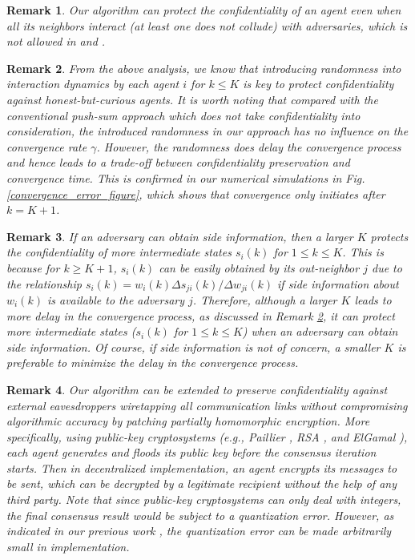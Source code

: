 \documentclass{IEEEtran}
\newtheorem{Remark}{Remark}
\begin{document}
\begin{Remark}\label{remark_different_from_other_papers}
	Our algorithm can protect the confidentiality of an agent even when all its neighbors interact (at least one does not collude) with adversaries, which is not allowed in \cite{mo2017privacy} and \cite{manitara2013privacy}.
\end{Remark}

\begin{Remark}\label{remark_tradeoff_privacy_convergence}
	From the above analysis, we know that introducing randomness into interaction dynamics by each agent $i$ for $k\leq K$ is key to protect confidentiality against honest-but-curious agents. It is worth noting that compared with the conventional push-sum approach which does not take confidentiality into consideration, the introduced randomness in our approach has no influence on the convergence rate $\gamma$. However, the randomness does delay the convergence process and hence leads to a trade-off between confidentiality preservation and convergence time. This is confirmed in our numerical simulations in Fig. \ref{convergence_error_figure}, which shows that convergence only initiates after $k = K+1$.
\end{Remark}

\begin{Remark}\label{remark_tradeoff_intermediate_privacy}	
	If an adversary can obtain side information, then a larger $K$ protects the confidentiality of more intermediate states $s_i(k)$ for $1\leq k\leq K$. This is because for $k \geq K+1$, $s_i(k)$ can be easily obtained by its out-neighbor $j$ due to the relationship $s_i(k)=w_i(k) \Delta s_{ji}(k)/\Delta w_{ji}(k)$ if side information about $w_i(k)$ is available to the adversary $j$. Therefore, although a larger $K$ leads to more delay in the convergence process, as discussed in Remark \ref{remark_tradeoff_privacy_convergence}, it can protect more intermediate states ($s_i(k)$ for $1 \leq k \leq K$) when an adversary can obtain side information. Of course, if side information is not of concern, a smaller $K$ is preferable to minimize the delay in the convergence process.
\end{Remark}

\begin{Remark}\label{remark_eavesdropper}
	Our algorithm can be extended to preserve confidentiality against external eavesdroppers wiretapping all communication links without compromising algorithmic accuracy by patching partially homomorphic encryption. More specifically, using public-key cryptosystems (e.g., Paillier \cite{paillier1999public}, RSA \cite{rivest1978method}, and ElGamal \cite{elgamal1985public}), each agent generates and floods its public key before the consensus iteration starts. Then in decentralized implementation, an agent encrypts its messages to be sent, which can be decrypted by a legitimate recipient without the help of any third party. Note that since public-key cryptosystems can only deal with integers, the final consensus result would be subject to a quantization error. However, as indicated in our previous work \cite{ruan2019secure}, the quantization error can be made arbitrarily small in implementation.
\end{Remark}
\end{document}
